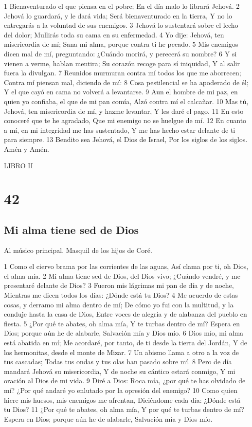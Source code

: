 1 Bienaventurado el que piensa en el pobre;
En el día malo lo librará Jehová.
2 Jehová lo guardará, y le dará vida;
Será bienaventurado en la tierra,
Y no lo entregarás a la voluntad de sus enemigos.
3 Jehová lo sustentará sobre el lecho del dolor;
Mullirás toda su cama en su enfermedad.
4 Yo dije: Jehová, ten misericordia de mí;
Sana mi alma, porque contra ti he pecado.
5 Mis enemigos dicen mal de mí, preguntando:
¿Cuándo morirá, y perecerá su nombre?
6 Y si vienen a verme, hablan mentira;
Su corazón recoge para sí iniquidad,
Y al salir fuera la divulgan.
7 Reunidos murmuran contra mí todos los que me aborrecen;
Contra mí piensan mal, diciendo de mí:
8 Cosa pestilencial se ha apoderado de él;
Y el que cayó en cama no volverá a levantarse.
9 Aun el hombre de mi paz, en quien yo confiaba, el que de mi pan comía,
Alzó contra mí el calcañar.
10 Mas tú, Jehová, ten misericordia de mí, y hazme levantar,
Y les daré el pago.
11 En esto conoceré que te he agradado,
Que mi enemigo no se huelgue de mí.
12 En cuanto a mí, en mi integridad me has sustentado,
Y me has hecho estar delante de ti para siempre.
13 Bendito sea Jehová, el Dios de Israel,
Por los siglos de los siglos.
Amén y Amén.



LIBRO II

\chapter{42}

\section*{Mi alma tiene sed de Dios}

Al músico principal. Masquil de los hijos de Coré.

1 Como el ciervo brama por las corrientes de las aguas,
Así clama por ti, oh Dios, el alma mía.
2 Mi alma tiene sed de Dios, del Dios vivo;
¿Cuándo vendré, y me presentaré delante de Dios?
3 Fueron mis lágrimas mi pan de día y de noche,
Mientras me dicen todos los días: ¿Dónde está tu Dios?
4 Me acuerdo de estas cosas, y derramo mi alma dentro de mí;
De cómo yo fui con la multitud, y la conduje hasta la casa de Dios,
Entre voces de alegría y de alabanza del pueblo en fiesta.
5 ¿Por qué te abates, oh alma mía,
Y te turbas dentro de mí?
Espera en Dios; porque aún he de alabarle,
Salvación mía y Dios mío.
6 Dios mío, mi alma está abatida en mí;
Me acordaré, por tanto, de ti desde la tierra del Jordán,
Y de los hermonitas, desde el monte de Mizar.
7 Un abismo llama a otro a la voz de tus cascadas;
Todas tus ondas y tus olas han pasado sobre mí.
8 Pero de día mandará Jehová su misericordia,
Y de noche su cántico estará conmigo,
Y mi oración al Dios de mi vida.
9 Diré a Dios: Roca mía, ¿por qué te has olvidado de mí?
¿Por qué andaré yo enlutado por la opresión del enemigo?
10 Como quien hiere mis huesos, mis enemigos me afrentan,
Diciéndome cada día: ¿Dónde está tu Dios?
11 ¿Por qué te abates, oh alma mía,
Y por qué te turbas dentro de mí?
Espera en Dios; porque aún he de alabarle,
Salvación mía y Dios mío.

